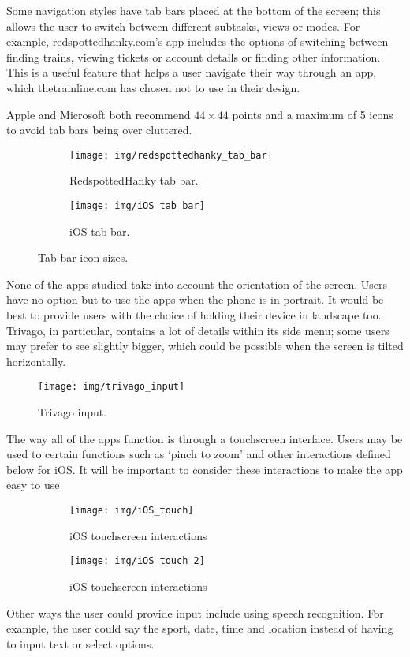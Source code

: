 Some navigation styles have tab bars placed at the bottom of the screen; this
allows the user to switch between different subtasks, views or modes. For
example, redspottedhanky.com's app includes the options of switching between
finding trains, viewing tickets or account details or finding other
information. This is a useful feature that helps a user navigate their way
through an app, which thetrainline.com has chosen not to use in their design.

Apple and Microsoft both recommend $44\times44$ points and a maximum of 5 icons
to avoid tab bars being over cluttered.
\begin{figure}[ht]
	\centering
	\begin{subfigure}[b]{0.35\textwidth}
		\texttt{[image: img/redspottedhanky\_tab\_bar]}
		\caption{RedspottedHanky tab bar. }\label{fig:redspottedhanky_tab_bar}
	\end{subfigure}%
	\qquad
	\begin{subfigure}[b]{0.4\textwidth}
		\texttt{[image: img/iOS\_tab\_bar]}
		\caption{iOS tab bar.}\label{fig:iOS_tab_bar}
	\end{subfigure}
	\caption{Tab bar icon sizes.}
\end{figure}

None of the apps studied take into account the orientation of the screen. Users
have no option but to use the apps when the phone is in portrait. It would be
best to provide users with the choice of holding their device in landscape too.
Trivago, in particular, contains a lot of details within its side menu; some
users may prefer to see slightly bigger, which could be possible when the
screen is tilted horizontally.
\begin{figure}[ht]
	\begin{center}
		\texttt{[image: img/trivago\_input]}
	\end{center}
	\caption{Trivago input\cite{TrivagoIOS}. }\label{fig:trivago_input}
\end{figure}

The way all of the apps function is through a touchscreen interface. Users may
be used to certain functions such as `pinch to zoom' and other interactions
defined below for iOS\@. It will be important to consider these interactions to
make the app easy to use
\begin{figure}[ht]
	\centering
	\begin{subfigure}[b]{0.4\textwidth}
		\texttt{[image: img/iOS\_touch]}
		\caption{iOS touchscreen interactions}\label{fig:iOS_touch}
	\end{subfigure}%
	\qquad
	\begin{subfigure}[b]{0.4\textwidth}
		\texttt{[image: img/iOS\_touch\_2]}
		\caption{iOS touchscreen interactions}
	\end{subfigure}
	\caption{}\label{fig:iOS_touch2}
\end{figure}

Other ways the user could provide input include using speech recognition. For
example, the user could say the sport, date, time and location instead of
having to input text or select options.

